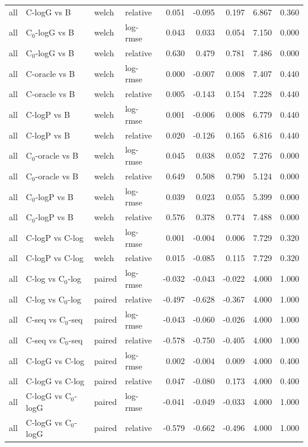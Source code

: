 \begin{longtable}{llllrrrrr}
all & C-logG vs B & welch & relative & 0.051 & -0.095 & 0.197 & 6.867 & 0.360 \\
all & C$_0$-logG vs B & welch & log-rmse & 0.043 & 0.033 & 0.054 & 7.150 & 0.000 \\
all & C$_0$-logG vs B & welch & relative & 0.630 & 0.479 & 0.781 & 7.486 & 0.000 \\
all & C-oracle vs B & welch & log-rmse & 0.000 & -0.007 & 0.008 & 7.407 & 0.440 \\
all & C-oracle vs B & welch & relative & 0.005 & -0.143 & 0.154 & 7.228 & 0.440 \\
all & C-logP vs B & welch & log-rmse & 0.001 & -0.006 & 0.008 & 6.779 & 0.440 \\
all & C-logP vs B & welch & relative & 0.020 & -0.126 & 0.165 & 6.816 & 0.440 \\
all & C$_0$-oracle vs B & welch & log-rmse & 0.045 & 0.038 & 0.052 & 7.276 & 0.000 \\
all & C$_0$-oracle vs B & welch & relative & 0.649 & 0.508 & 0.790 & 5.124 & 0.000 \\
all & C$_0$-logP vs B & welch & log-rmse & 0.039 & 0.023 & 0.055 & 5.399 & 0.000 \\
all & C$_0$-logP vs B & welch & relative & 0.576 & 0.378 & 0.774 & 7.488 & 0.000 \\
all & C-logP vs C-log & welch & log-rmse & 0.001 & -0.004 & 0.006 & 7.729 & 0.320 \\
all & C-logP vs C-log & welch & relative & 0.015 & -0.085 & 0.115 & 7.729 & 0.320 \\
all & C-log vs C$_0$-log & paired & log-rmse & -0.032 & -0.043 & -0.022 & 4.000 & 1.000 \\
all & C-log vs C$_0$-log & paired & relative & -0.497 & -0.628 & -0.367 & 4.000 & 1.000 \\
all & C-seq vs C$_0$-seq & paired & log-rmse & -0.043 & -0.060 & -0.026 & 4.000 & 1.000 \\
all & C-seq vs C$_0$-seq & paired & relative & -0.578 & -0.750 & -0.405 & 4.000 & 1.000 \\
all & C-logG vs C-log & paired & log-rmse & 0.002 & -0.004 & 0.009 & 4.000 & 0.400 \\
all & C-logG vs C-log & paired & relative & 0.047 & -0.080 & 0.173 & 4.000 & 0.400 \\
all & C-logG vs C$_0$-logG & paired & log-rmse & -0.041 & -0.049 & -0.033 & 4.000 & 1.000 \\
all & C-logG vs C$_0$-logG & paired & relative & -0.579 & -0.662 & -0.496 & 4.000 & 1.000 \\

\end{longtable}
